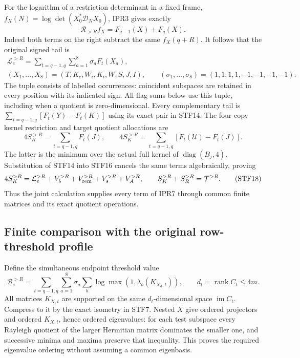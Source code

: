 For the logarithm of a restriction determinant in a fixed frame,
$f_X(N)=\log\det(X_0^*\mathcal D_NX_0)$, IPR3 gives exactly
\[
 \mathcal R_{>R}f_X=F_{q-1}(X)+F_q(X).                    \tag{STF15}
\]
Indeed both terms on the right subtract the same $f_X(q+R)$.
It follows that the original signed tail is
\[
\begin{gathered}
\mathcal L_e^{>R}=\sum_{t=q-1,q}\sum_{a=1}^8\sigma_a F_t(X_a),\\
(X_1,\ldots,X_8)=(T,K_c,W_i,K_i,W,S,J,I),\qquad
(\sigma_1,\ldots,\sigma_8)=(1,1,1,1,-1,-1,-1,-1).
\end{gathered}
                                                               \tag{STF16}
\]
The tuple consists of labelled occurrences: coincident subspaces are
retained in every position with its indicated sign. All flag sums below
use this tuple, including when a quotient is zero-dimensional.
Every complementary tail is $\sum_{t=q-1,q}[F_t(Y)-F_t(K)]$
using its exact pair in STF14. The four-copy kernel restriction and
target quotient allocations are
\[
 4S_R^{>R}=\sum_{t=q-1,q}F_t(J),\qquad
 4S_K^{>R}=\sum_{t=q-1,q}[F_t(\mathcal U)-F_t(J)].         \tag{STF17}
\]
The latter is the minimum over the actual full kernel of
$\operatorname{diag}(B_j,4)$. Substitution of STF14 into STF16 cancels
the same terms algebraically, proving
\[
 4S_K^{>R}=\mathcal L_e^{>R}+V_b^{>R}+V_{\rm rem}^{>R}
                        +V_s^{>R}+V_A^{>R},\qquad
 S_K^{>R}+S_R^{>R}=\mathcal T^{>R}.                       \tag{STF18}
\]
Thus the joint calculation supplies every term of IPR7 through common
finite matrices and its exact quotient operations.

\subsection{Finite comparison with the original row-threshold profile}
Define the simultaneous endpoint threshold value
\[
\mathcal B_e^{>R}=\sum_{t=q-1,q}\sum_{a=1}^8\sigma_a
             \sum_b\log\max(1,\lambda_b(K_{X_a,t})),
 \qquad d_t=\operatorname{rank}C_t\le4m.                 \tag{STF19}
\]
All matrices $K_{X,t}$ are supported on the same $d_t$-dimensional
space $\operatorname{im}C_t$. Compress to it by the exact isometry in
STF7. Nested $X$ give ordered projectors and ordered $K_{X,t}$, hence
ordered eigenvalues: for each test subspace every Rayleigh quotient of
the larger Hermitian matrix dominates the smaller one, and successive
minima and maxima preserve that inequality. This proves the required
eigenvalue ordering without assuming a common eigenbasis.

